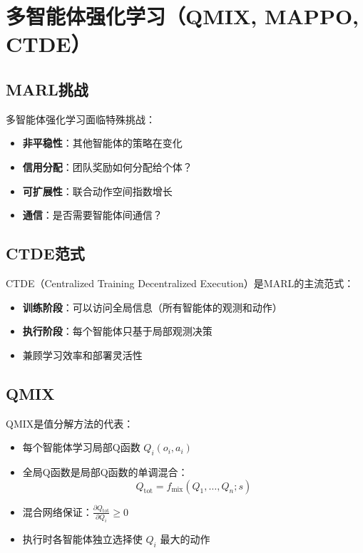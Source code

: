 \section{多智能体强化学习（QMIX, MAPPO, CTDE）}

\subsection{MARL挑战}

多智能体强化学习面临特殊挑战：
\begin{itemize}[leftmargin=2em]
  \item \textbf{非平稳性}：其他智能体的策略在变化
  \item \textbf{信用分配}：团队奖励如何分配给个体？
  \item \textbf{可扩展性}：联合动作空间指数增长
  \item \textbf{通信}：是否需要智能体间通信？
\end{itemize}

\subsection{CTDE范式}

\begin{keypoint}
CTDE（Centralized Training Decentralized Execution）是MARL的主流范式：
\begin{itemize}
  \item \textbf{训练阶段}：可以访问全局信息（所有智能体的观测和动作）
  \item \textbf{执行阶段}：每个智能体只基于局部观测决策
  \item 兼顾学习效率和部署灵活性
\end{itemize}
\end{keypoint}

\subsection{QMIX}

QMIX是值分解方法的代表：

\begin{itemize}[leftmargin=2em]
  \item 每个智能体学习局部Q函数 $Q_i(o_i, a_i)$
  \item 全局Q函数是局部Q函数的单调混合：
  \[ Q_{\text{tot}} = f_{\text{mix}}(Q_1, \ldots, Q_n; s) \]
  \item 混合网络保证：$\frac{\partial Q_{\text{tot}}}{\partial Q_i} \geq 0$
  \item 执行时各智能体独立选择使 $Q_i$ 最大的动作
\end{itemize}

